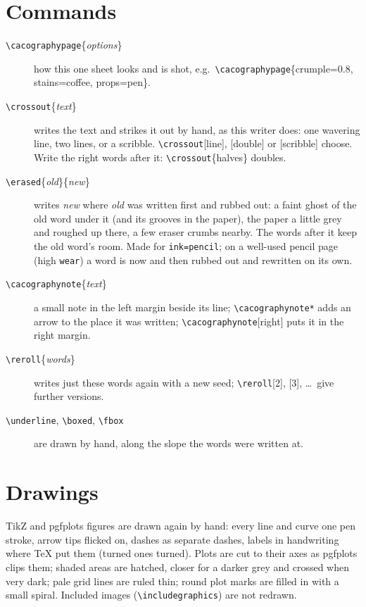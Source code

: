 \documentclass[11pt]{article}
\newcommand{\opt}[1]{\texttt{#1}}
\newcommand{\cs}[1]{\texttt{\textbackslash #1}}
\begin{document}
\section{Commands}\label{sec:commands}
\begin{description}
\item[\cs{cacographypage}\{\emph{options}\}] how this one sheet looks and is shot, e.g.\
  \cs{cacographypage}\{crumple=0.8, stains=coffee, props=pen\}.
\item[\cs{crossout}\{\emph{text}\}] writes the text and strikes it out by hand, as this
  writer does: one wavering line, two lines, or a scribble. \cs{crossout}[line],
  [double] or [scribble] choose. Write the right words after it:
  \cs{crossout}\{halves\} doubles.
\item[\cs{erased}\{\emph{old}\}\{\emph{new}\}] writes \emph{new} where \emph{old} was written
  first and rubbed out: a faint ghost of the old word under it (and its grooves in the
  paper), the paper a little grey and roughed up there, a few eraser crumbs nearby. The
  words after it keep the old word's room. Made for \opt{ink=pencil}; on a well-used pencil
  page (high \opt{wear}) a word is now and then rubbed out and rewritten on its own.
\item[\cs{cacographynote}\{\emph{text}\}] a small note in the left margin beside its line;
  \cs{cacographynote*} adds an arrow to the place it was written; \cs{cacographynote}[right]
  puts it in the right margin.
\item[\cs{reroll}\{\emph{words}\}] writes just these words again with a new seed;
  \cs{reroll}[2], [3], \dots\ give further versions.
\item[\cs{underline}, \cs{boxed}, \cs{fbox}] are drawn by hand, along the slope the words
  were written at.
\end{description}

\section{Drawings}
TikZ and pgfplots figures are drawn again by hand: every line and curve one pen stroke,
arrow tips flicked on, dashes as separate dashes, labels in handwriting where TeX put them
(turned ones turned). Plots are cut to their axes as pgfplots clips them; shaded areas are
hatched, closer for a darker grey and crossed when very dark; pale grid lines are ruled thin;
round plot marks are filled in with a small spiral. Included images (\cs{includegraphics})
are not redrawn.
\end{document}
